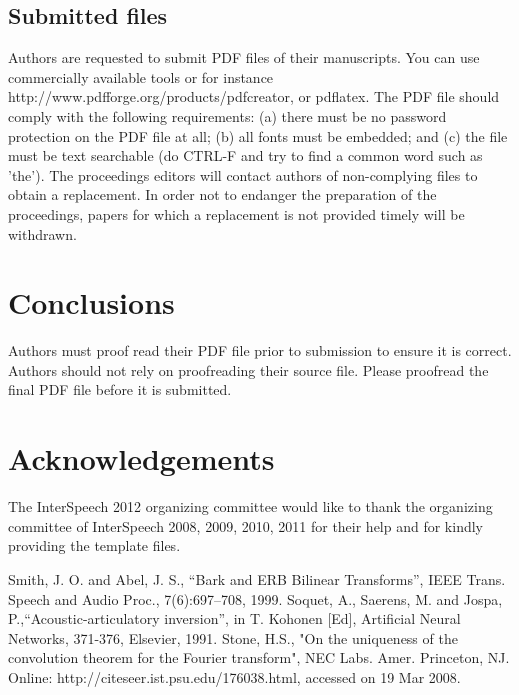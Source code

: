 \documentclass[a4paper]{article}
\begin{document}
\subsection{Submitted files}
Authors are requested to submit PDF files of their manuscripts.
You can use commercially available tools or for instance http://www.pdfforge.org/products/pdfcreator, or pdflatex.
The PDF file should comply with the following requirements:
(a) there must be no password protection on the PDF file at all;
(b) all fonts must be embedded; and
(c) the file must be text searchable (do CTRL-F and try to find a common word such as 'the').
The proceedings editors will contact authors of non-complying files to obtain a replacement.
In order not to endanger the preparation of the proceedings, papers for which a replacement is not provided timely will be withdrawn.


\section{Conclusions}
Authors must proof read their PDF file prior to submission to ensure it is correct.
Authors should not rely on proofreading their source file.
Please proofread the final PDF file before it is submitted.

\section{Acknowledgements}
The InterSpeech 2012 organizing committee would like to thank the organizing committee of InterSpeech 2008, 2009, 2010, 2011 for their help and for kindly providing the template files.

\eightpt

\begin{thebibliography}{10}
 Smith, J. O. and Abel, J. S., 
``Bark and {ERB} Bilinear Transforms'', 
IEEE Trans. Speech and Audio Proc., 7(6):697--708, 1999.  
 Soquet, A., Saerens, M. and Jospa, P.,``Acoustic-articulatory
inversion'', in T. Kohonen [Ed], Artificial Neural Networks, 371-376,
Elsevier, 1991.
 Stone, H.S., "On the uniqueness of the convolution theorem
for the Fourier transform", NEC Labs. Amer. Princeton, NJ. 
Online: http://citeseer.ist.psu.edu/176038.html, accessed on 19 Mar 2008.
\end{thebibliography}
\end{document}
